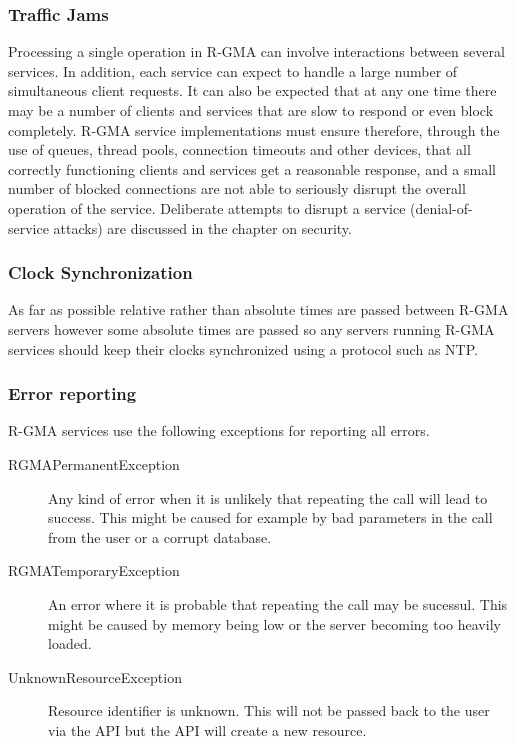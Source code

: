 \subsubsection{Traffic Jams}

Processing a single operation in R-GMA can involve interactions
between several services. In addition, each service can expect to
handle a large number of simultaneous client requests. It can also be
expected that at any one time there may be a number of clients and
services that are slow to respond or even block completely. R-GMA
service implementations must ensure therefore, through the use of
queues, thread pools, connection timeouts and other devices, that all
correctly functioning clients and services get a reasonable response,
and a small number of blocked connections are not able to seriously
disrupt the overall operation of the service. Deliberate attempts to disrupt a
service (denial-of-service attacks) are discussed in the chapter on security.

\subsubsection{Clock Synchronization}

As far as possible relative rather than absolute times are passed between
R-GMA servers however some absolute times are passed so any servers running
R-GMA services should keep their clocks synchronized using a protocol such as NTP.

\subsubsection{Error reporting}\label{sec:BackgroundErrorReporting}

R-GMA services use the following exceptions for reporting all
errors.

\begin{description}


\item[RGMAPermanentException] Any kind of error when it is unlikely that
repeating the call will lead to success. This might be caused for example by bad
parameters in the call from the user or a corrupt database.
\item[RGMATemporaryException] An error where it is probable that repeating the
call may be sucessul. This might be caused by memory being low or the server
becoming too heavily loaded.
\item[UnknownResourceException] Resource identifier
is unknown. This will not be passed back to the user via the API but the API will
create a new resource.
\end{description}

